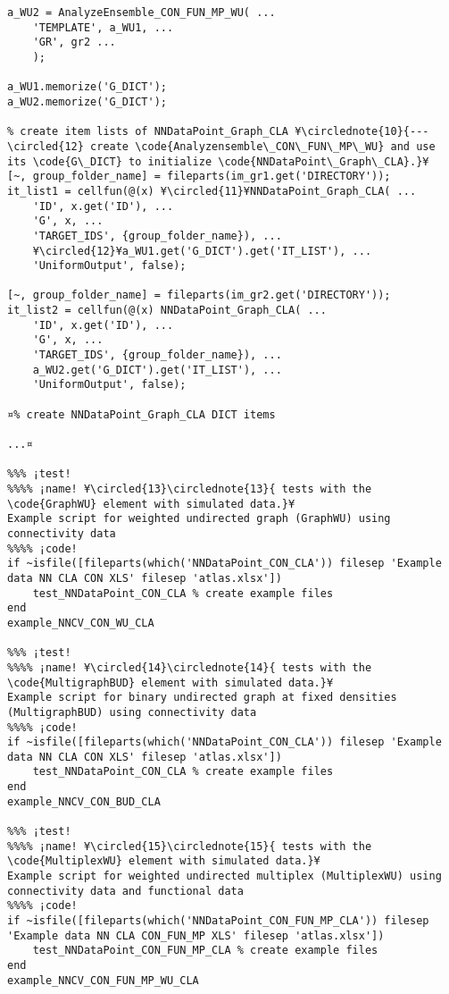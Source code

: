 \documentclass{tufte-handout}
\begin{document}
\begin{lstlisting}
a_WU2 = AnalyzeEnsemble_CON_FUN_MP_WU( ...
    'TEMPLATE', a_WU1, ...
    'GR', gr2 ...
    );

a_WU1.memorize('G_DICT');
a_WU2.memorize('G_DICT');

% create item lists of NNDataPoint_Graph_CLA ¥\circlednote{10}{---\circled{12} create \code{Analyzensemble\_CON\_FUN\_MP\_WU} and use its \code{G\_DICT} to initialize \code{NNDataPoint\_Graph\_CLA}.}¥
[~, group_folder_name] = fileparts(im_gr1.get('DIRECTORY'));
it_list1 = cellfun(@(x) ¥\circled{11}¥NNDataPoint_Graph_CLA( ...
    'ID', x.get('ID'), ...
    'G', x, ...
    'TARGET_IDS', {group_folder_name}), ...
    ¥\circled{12}¥a_WU1.get('G_DICT').get('IT_LIST'), ...
    'UniformOutput', false);

[~, group_folder_name] = fileparts(im_gr2.get('DIRECTORY'));
it_list2 = cellfun(@(x) NNDataPoint_Graph_CLA( ...
    'ID', x.get('ID'), ...
    'G', x, ...
    'TARGET_IDS', {group_folder_name}), ...
    a_WU2.get('G_DICT').get('IT_LIST'), ...
    'UniformOutput', false);

¤% create NNDataPoint_Graph_CLA DICT items

...¤

%%% ¡test!
%%%% ¡name! ¥\circled{13}\circlednote{13}{ tests with the \code{GraphWU} element with simulated data.}¥
Example script for weighted undirected graph (GraphWU) using connectivity data
%%%% ¡code!
if ~isfile([fileparts(which('NNDataPoint_CON_CLA')) filesep 'Example data NN CLA CON XLS' filesep 'atlas.xlsx'])
    test_NNDataPoint_CON_CLA % create example files
end
example_NNCV_CON_WU_CLA

%%% ¡test!
%%%% ¡name! ¥\circled{14}\circlednote{14}{ tests with the \code{MultigraphBUD} element with simulated data.}¥
Example script for binary undirected graph at fixed densities (MultigraphBUD) using connectivity data
%%%% ¡code!
if ~isfile([fileparts(which('NNDataPoint_CON_CLA')) filesep 'Example data NN CLA CON XLS' filesep 'atlas.xlsx'])
    test_NNDataPoint_CON_CLA % create example files
end
example_NNCV_CON_BUD_CLA

%%% ¡test!
%%%% ¡name! ¥\circled{15}\circlednote{15}{ tests with the \code{MultiplexWU} element with simulated data.}¥
Example script for weighted undirected multiplex (MultiplexWU) using connectivity data and functional data
%%%% ¡code!
if ~isfile([fileparts(which('NNDataPoint_CON_FUN_MP_CLA')) filesep 'Example data NN CLA CON_FUN_MP XLS' filesep 'atlas.xlsx'])
    test_NNDataPoint_CON_FUN_MP_CLA % create example files
end
example_NNCV_CON_FUN_MP_WU_CLA

\end{lstlisting}
\end{document}
